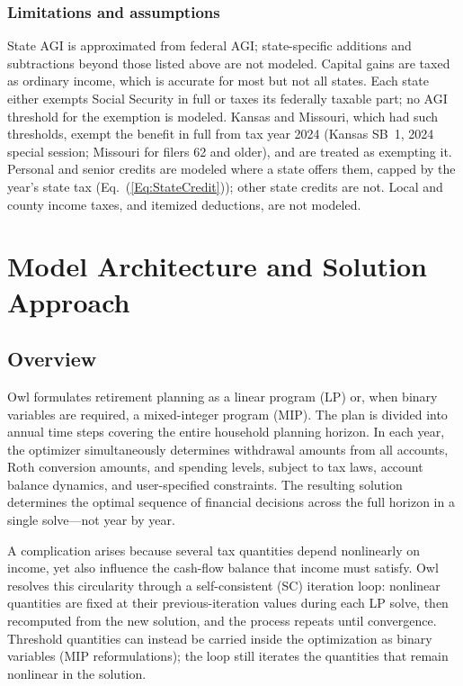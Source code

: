 \documentclass[fleqn,12pt]{report}
\begin{document}
\subsection*{Limitations and assumptions}
State AGI is approximated from federal AGI; state-specific additions and
subtractions beyond those listed above are not modeled.
Capital gains are taxed as ordinary income, which is accurate for most but not
all states.
Each state either exempts Social Security in full or taxes its federally taxable
part; no AGI threshold for the exemption is modeled. Kansas and Missouri, which
had such thresholds, exempt the benefit in full from tax year 2024 (Kansas
SB~1, 2024 special session; Missouri for filers 62 and older), and are treated
as exempting it.
Personal and senior credits are modeled where a state offers them, capped by the
year's state tax (Eq.~(\ref{Eq:StateCredit})); other state credits are not.
Local and county income taxes, and itemized deductions, are not modeled.

\chapter{Model Architecture and Solution Approach}
\label{Chap:Architecture}

\section{Overview}

Owl formulates retirement planning as a linear program (LP) or, when
binary variables are required, a mixed-integer program (MIP).
The plan is divided into annual time steps covering the entire household
planning horizon.
In each year, the optimizer simultaneously determines withdrawal amounts
from all accounts, Roth conversion amounts, and spending levels, subject to
tax laws, account balance dynamics, and user-specified constraints.
The resulting solution determines the optimal sequence of financial
decisions across the full horizon in a single solve---not year by year.

A complication arises because several tax quantities depend nonlinearly on
income, yet also influence the cash-flow balance that income must satisfy.
Owl resolves this circularity through a self-consistent (SC) iteration
loop: nonlinear quantities are fixed at their previous-iteration values
during each LP solve, then recomputed from the new solution, and the
process repeats until convergence.
Threshold quantities can instead be carried inside the optimization as binary
variables (MIP reformulations); the loop still iterates the quantities that remain
nonlinear in the solution.
\end{document}
